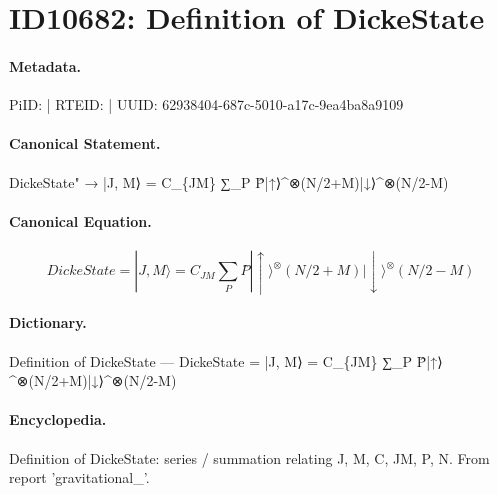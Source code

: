 \section*{ID10682: Definition of DickeState}
\paragraph{Metadata.}
PiID:  | RTEID:  | UUID: 62938404-687c-5010-a17c-9ea4ba8a9109

\paragraph{Canonical Statement.}
DickeState" → |J, M⟩ = C\_\{JM\} ∑\_P P̂|↑⟩\textasciicircum{}⊗(N/2+M)|↓⟩\textasciicircum{}⊗(N/2-M)

\paragraph{Canonical Equation.}
\[
DickeState = |J, M⟩ = C_{JM} ∑_P P̂|↑⟩^⊗(N/2+M)|↓⟩^⊗(N/2-M)
\]

\paragraph{Dictionary.}
Definition of DickeState — DickeState = |J, M⟩ = C\_\{JM\} ∑\_P P̂|↑⟩\textasciicircum{}⊗(N/2+M)|↓⟩\textasciicircum{}⊗(N/2-M)

\paragraph{Encyclopedia.}
Definition of DickeState: series / summation relating J, M, C, JM, P, N. From report 'gravitational\_'.

